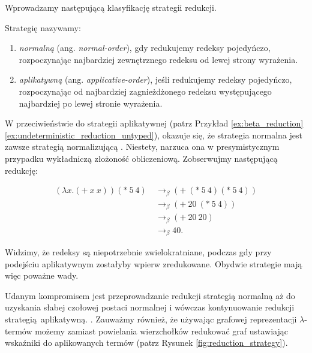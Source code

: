 Wprowadzamy następującą klasyfikację strategii redukcji.

\begin{definicja}
Strategię nazywamy:
\begin{enumerate}
\item \emph{normalną} (ang. \emph{normal-order}), gdy redukujemy redeksy pojedyńczo, rozpoczynając najbardziej zewnętrznego redeksu od lewej strony wyrażenia.
\item \emph{aplikatywną} (ang. \emph{applicative-order}), jeśli redukujemy redeksy pojedyńczo, rozpoczynając od najbardziej zagnieżdżonego redeksu występującego najbardziej po lewej stronie wyrażenia.
\end{enumerate}
\end{definicja}

W przeciwieństwie do strategii aplikatywnej (patrz Przykład \ref{ex:beta_reduction}\ref{ex:undeterministic_reduction_untyped}), okazuje się, że strategia normalna jest zawsze strategią normalizującą \cite[Rozdział 1.5]{Urzyczyn2006}. Niestety, narzuca ona w presymistycznym przypadku wykładniczą złożoność obliczeniową. Zobserwujmy następującą redukcję:

\begin{align*}
  \left(\lambda x.(+\ x\ x)\right)(*\ 5\ 4)\ &\to_\beta (+\ (*\ 5\ 4)(*\ 5\ 4))\tag{\(\blacktriangledown\)}\label{ex:normal_reduction}\\
  &\to_\beta (+\ 20\ (*\ 5\ 4))\\
  &\to_\beta (+\ 20\ 20)\\
  &\to_\beta 40.
\end{align*}

Widzimy, że redeksy są niepotrzebnie zwielokratniane, podczas gdy przy podejściu aplikatywnym zostałyby wpierw zredukowane. Obydwie strategie mają więc poważne wady.

Udanym kompromisem jest przeprowadzanie redukcji strategią normalną aż do uzyskania słabej czołowej postaci normalnej i wówczas kontynuowanie redukcji strategią aplikatywną. \cite[Rozdział 11.3]{PeytonJones:1987:IFP:1096899}. Zauważmy również, że używając grafowej reprezentacji \(\lambda\)-termów możemy zamiast powielania wierzchołków redukować graf ustawiając wskaźniki do aplikowanych termów (patrz Rysunek \ref{fig:reduction_strategy}). 


